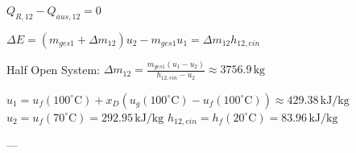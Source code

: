 \( Q_{R,12} - Q_{aus,12} = 0 \)  

\( \Delta E = (m_{ges1} + \Delta m_{12}) u_2 - m_{ges1} u_1 = \Delta m_{12} h_{12,ein} \)  

Half Open System:  
\( \Delta m_{12} = \frac{m_{ges1} (u_1 - u_2)}{h_{12,ein} - u_2} \approx 3756.9 \, \text{kg} \)  

\( u_1 = u_f(100^\circ \text{C}) + x_D (u_g(100^\circ \text{C}) - u_f(100^\circ \text{C})) \approx 429.38 \, \text{kJ/kg} \)  
\( u_2 = u_f(70^\circ \text{C}) = 292.95 \, \text{kJ/kg} \)  
\( h_{12,ein} = h_f(20^\circ \text{C}) = 83.96 \, \text{kJ/kg} \)  

---